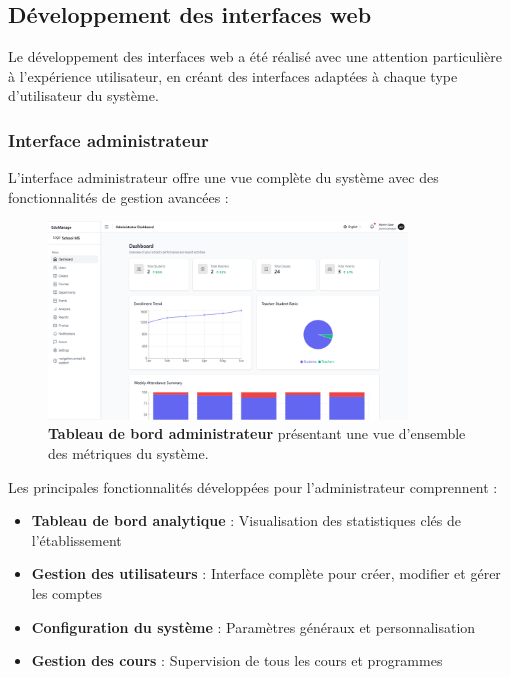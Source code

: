 \subsection{Développement des interfaces web}

Le développement des interfaces web a été réalisé avec une attention particulière à l'expérience utilisateur, en créant des interfaces adaptées à chaque type d'utilisateur du système.

\subsubsection{Interface administrateur}

L'interface administrateur offre une vue complète du système avec des fonctionnalités de gestion avancées :

\begin{figure}[H]
  \centering
  \includegraphics[width=0.85\textwidth,keepaspectratio]{pfe-pics/admin/Screenshot 2025-06-09 at 22-38-06 Vite React TS.png}
  \caption{\textbf{Tableau de bord administrateur} présentant une vue d'ensemble des métriques du système.}
  \label{fig:admin_dashboard}
\end{figure}

Les principales fonctionnalités développées pour l'administrateur comprennent :

\begin{itemize}
  \item \textbf{Tableau de bord analytique} : Visualisation des statistiques clés de l'établissement
  
  \item \textbf{Gestion des utilisateurs} : Interface complète pour créer, modifier et gérer les comptes
  
  \item \textbf{Configuration du système} : Paramètres généraux et personnalisation
  
  \item \textbf{Gestion des cours} : Supervision de tous les cours et programmes
\end{itemize}

